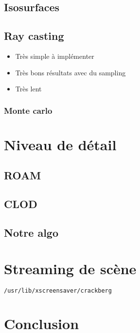 \documentclass{beamer}
\begin{document}
\subsection{Isosurfaces}

\subsection{Ray casting}

\begin{frame}
  \begin{itemize}
  \item Très simple à implémenter
  \item Très bons résultats avec du sampling
  \item Très lent
  \end{itemize}
\end{frame}

\subsubsection{Monte carlo}

\section{Niveau de détail}

\subsection{ROAM}

\subsection{CLOD}

\subsection{Notre algo}


\section{Streaming de scène}

\begin{frame}
  \texttt{/usr/lib/xscreensaver/crackberg}
\end{frame}

\section{Conclusion}
\end{document}
